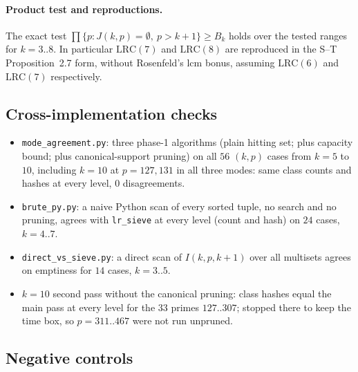 \documentclass[10pt]{article}
\newcommand{\LRC}[1]{\mathrm{LRC}(#1)}
\begin{document}
\paragraph{Product test and reproductions.} The exact test $\prod\{p:J(k,p)=\emptyset,\ p>k+1\}\ge B_k$ holds over the tested ranges for $k=3..8$. In particular $\LRC{7}$ and $\LRC{8}$ are reproduced in the S--T Proposition~2.7 form, without Rosenfeld's lcm bonus, assuming $\LRC{6}$ and $\LRC{7}$ respectively.

\subsection{Cross-implementation checks}
\begin{itemize}\itemsep=0pt
\item \texttt{mode\_agreement.py}: three phase-1 algorithms (plain hitting set; plus capacity bound; plus canonical-support pruning) on all $56$ $(k,p)$ cases from $k=5$ to $10$, including $k=10$ at $p=127,131$ in all three modes: same class counts and hashes at every level, $0$ disagreements.
\item \texttt{brute\_py.py}: a naive Python scan of every sorted tuple, no search and no pruning, agrees with \texttt{lr\_sieve} at every level (count and hash) on $24$ cases, $k=4..7$.
\item \texttt{direct\_vs\_sieve.py}: a direct scan of $I(k,p,k+1)$ over all multisets agrees on emptiness for $14$ cases, $k=3..5$.
\item $k=10$ second pass without the canonical pruning: class hashes equal the main pass at every level for the $33$ primes $127..307$; stopped there to keep the time box, so $p=311..467$ were not run unpruned.
\end{itemize}

\subsection{Negative controls}
\end{document}
